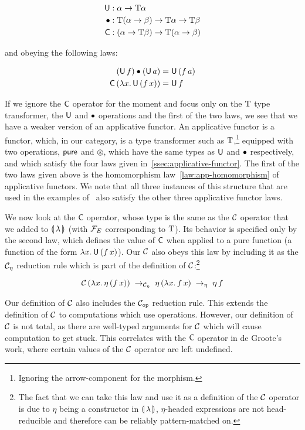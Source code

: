 \begin{align*}
  \mathsf{U} &: \alpha \to \text{T} \alpha \\
  \mathbin{\bullet} &: \text{T}(\alpha \to \beta) \to \text{T} \alpha \to \text{T} \beta \\
  \mathsf{C} &: (\alpha \to \text{T} \beta) \to \text{T} (\alpha \to \beta)
\end{align*}

and obeying the following laws:

\begin{align*}
  (\mathsf{U}\,f) \mathbin{\bullet} (\mathsf{U}\,a) &= \mathsf{U}\,(f\,a) \\
  \mathsf{C}\,(\lambda x.\, \mathsf{U}\,(f\,x)) &= \mathsf{U}\,f
\end{align*}

If we ignore the $\mathsf{C}$ operator for the moment and focus only on the $\text{T}$
type transformer, the $\mathsf{U}$ and $\mathbin{\bullet}$ operations and the first of the
two laws, we see that we have a weaker version of an applicative
functor. An applicative functor is a functor, which, in our category, is a
type transformer such as $\text{T}$,\footnote{Ignoring the arrow-component for
  the morphism.} equipped with two operations, $\mathsf{pure}$ and $\circledast$,
which have the same types as $\mathsf{U}$ and $\mathbin{\bullet}$ respectively, and which
satisfy the four laws given in~\ref{ssec:applicative-functor}. The first of
the two laws given above is the homomorphism law~\ref{law:app-homomorphism}
of applicative functors. We note that all three instances of this structure
that are used in the examples of~\cite{degroote2015conservativity} also
satisfy the other three applicative functor laws.

We now look at the $\mathsf{C}$ operator, whose type is the same as the $\mathcal{C}$
operator that we added to ${\llparenthesis \, \lambda \, \rrparenthesis}$ (with $\mathcal{F}_E$ corresponding to
$\text{T}$). Its behavior is specified only by the second law, which defines the
value of $\mathsf{C}$ when applied to a pure function (a function of the form
$\lambda x.\, \mathsf{U}\,(f\,x)$). Our $\mathcal{C}$ also obeys this law by
including it as the $\mathcal{C}_\eta$ reduction rule which is part of the
definition of $\mathcal{C}$:\footnote{The fact that we can take this law and use it
  as a definition of the $\mathcal{C}$ operator is due to $\eta$ being a
  constructor in ${\llparenthesis \, \lambda \, \rrparenthesis}$, $\eta$-headed expressions are not head-reducible
  and therefore can be reliably pattern-matched on.}

$$
\mathcal{C}\,(\lambda x.\, \eta\,(f\,x)) \; \to_{\mathcal{C}_\eta} \;
\eta\,(\lambda x.\, f\,x) \; \to_\eta \; \eta\,f
$$

Our definition of $\mathcal{C}$ also includes the $\mathcal{C}_{\mathtt{op}}$ reduction
rule. This extends the definition of $\mathcal{C}$ to computations which use
operations. However, our definition of $\mathcal{C}$ is not total, as there are
well-typed arguments for $\mathcal{C}$ which will cause computation to get
stuck. This correlates with the $\mathsf{C}$ operator in de Groote's work, where
certain values of the $\mathcal{C}$ operator are left undefined.

